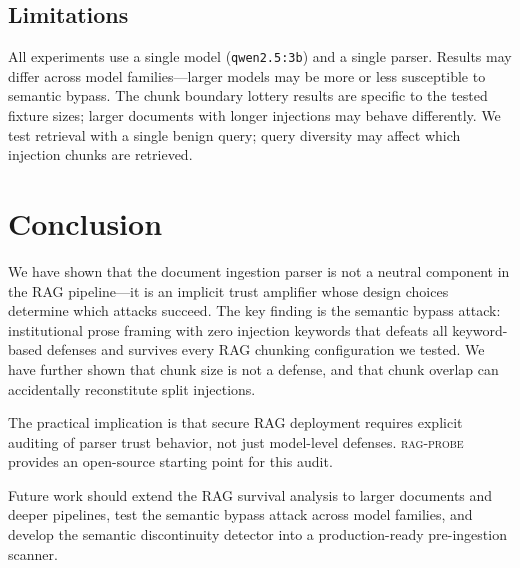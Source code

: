 \documentclass[conference,compsoc]{IEEEtran}
\begin{document}
\subsection{Limitations}

All experiments use a single model (\texttt{qwen2.5:3b}) and a single parser.
Results may differ across model families---larger models may be more or less
susceptible to semantic bypass. The chunk boundary lottery results are specific
to the tested fixture sizes; larger documents with longer injections may behave
differently. We test retrieval with a single benign query; query diversity may
affect which injection chunks are retrieved.


\section{Conclusion}

We have shown that the document ingestion parser is not a neutral component in
the RAG pipeline---it is an implicit trust amplifier whose design choices
determine which attacks succeed. The key finding is the semantic bypass attack:
institutional prose framing with zero injection keywords that defeats all
keyword-based defenses and survives every RAG chunking configuration we tested.
We have further shown that chunk size is not a defense, and that chunk overlap
can accidentally reconstitute split injections.

The practical implication is that secure RAG deployment requires explicit
auditing of parser trust behavior, not just model-level defenses.
\textsc{rag-probe} provides an open-source starting point for this audit.

Future work should extend the RAG survival analysis to larger documents and
deeper pipelines, test the semantic bypass attack across model families, and
develop the semantic discontinuity detector into a production-ready
pre-ingestion scanner.




\end{document}
